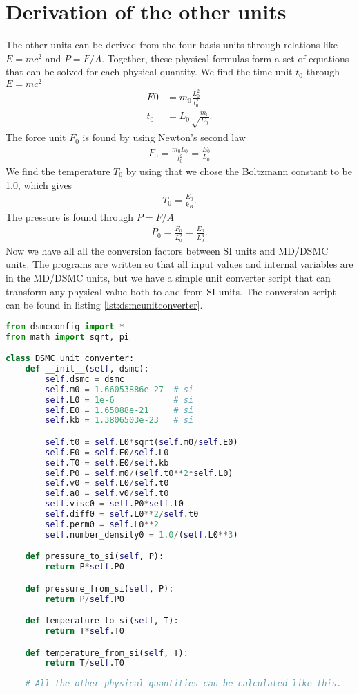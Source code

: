 \section{Derivation of the other units}
The other units can be derived from the four basis units through relations like $E=mc^2$ and $P=F/A$. Together, these physical formulas form a set of equations that can be solved for each physical quantity. We find the time unit $t_0$ through $E=mc^2$
\begin{align}
	E0 &= m_0\frac{L_0^2}{t_0^2}\\
	t_0 &= L_0\sqrt\frac{m_0}{E_0}.
\end{align}
The force unit $F_0$ is found by using Newton's second law
\begin{align}
	F_0 = \frac{m_0L_0}{t_0^2} = \frac{E_0}{L_0}
\end{align}
We find the temperature $T_0$ by using that we chose the Boltzmann constant to be 1.0, which gives
\begin{align}
	T_0 = \frac{E_0}{k_B}.
\end{align}
The pressure is found through $P=F/A$
\begin{align}
	P_0 = \frac{F_0}{L_0^2} = \frac{E_0}{L_0^3}.
\end{align}
Now we have all all the conversion factors between SI units and MD/DSMC units. The programs are written so that all input values and internal variables are in the MD/DSMC units, but we have a simple unit converter script that can transform any physical value both to and from SI units. The conversion script can be found in listing \ref{lst:dsmcunitconverter}.
\begin{lstlisting}[caption=dsmcUnitConverter.py, label=lst:dsmcunitconverter, language=Python]
from dsmcconfig import *
from math import sqrt, pi

class DSMC_unit_converter:
	def __init__(self, dsmc):
		self.dsmc = dsmc
		self.m0 = 1.66053886e-27  # si
		self.L0 = 1e-6            # si
		self.E0 = 1.65088e-21     # si
		self.kb = 1.3806503e-23   # si

		self.t0 = self.L0*sqrt(self.m0/self.E0)
		self.F0 = self.E0/self.L0
		self.T0 = self.E0/self.kb
		self.P0 = self.m0/(self.t0**2*self.L0)
		self.v0 = self.L0/self.t0
		self.a0 = self.v0/self.t0
		self.visc0 = self.P0*self.t0
		self.diff0 = self.L0**2/self.t0
		self.perm0 = self.L0**2
		self.number_density0 = 1.0/(self.L0**3)

	def pressure_to_si(self, P): 
		return P*self.P0

	def pressure_from_si(self, P): 
		return P/self.P0

	def temperature_to_si(self, T):
		return T*self.T0

	def temperature_from_si(self, T):
		return T/self.T0
	
	# All the other physical quantities can be calculated like this.
\end{lstlisting}